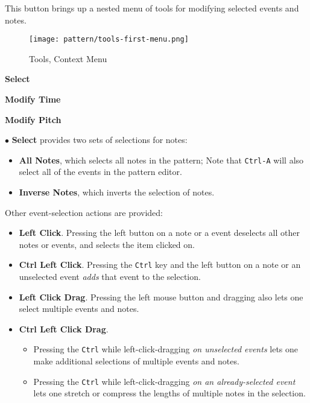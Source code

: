    This button brings up a nested menu of tools for modifying selected
   events and notes.

\begin{figure}[H]
   \centering 
   \texttt{[image: pattern/tools-first-menu.png]}
   \caption{Tools, Context Menu}
   \label{fig:pattern_editor_tools_first_menu}
\end{figure}

   \begin{enumber}
      \item \textbf{Select}
      \item \textbf{Modify Time}
      \item \textbf{Modify Pitch}
   \end{enumber}

   $\bullet$ \textbf{Select} provides two sets of selections for notes:
   \begin{itemize}
      \item \textbf{All Notes}, which selects all notes in the pattern;
         Note that  \texttt{Ctrl-A} will also select
         all of the events in the pattern editor.
      \item \textbf{Inverse Notes}, which inverts the selection of notes.
   \end{itemize}

   Other event-selection actions are provided:

   \begin{itemize}
      \item {}
         \textbf{Left Click}.
         Pressing the left button on a note or a event deselects all other
         notes or events, and selects the item clicked on.
      \item {}
         \textbf{Ctrl Left Click}.
         Pressing the \texttt{Ctrl} key and the left button on a note or an
         unselected event \textsl{adds} that event to the selection.
      \item {}
         \textbf{Left Click Drag}.
         Pressing the left mouse button and dragging also lets one
         select multiple events and notes.
      \item {}
         \textbf{Ctrl Left Click Drag}.
         \begin{itemize}
            \item Pressing the \texttt{Ctrl} while left-click-dragging
               \textsl{on unselected events} lets one make additional
               selections of multiple events and notes.
            \item Pressing the \texttt{Ctrl} while left-click-dragging
               \textsl{on an already-selected event} lets one stretch or
               compress the lengths of multiple notes in the selection.
         \end{itemize}
   \end{itemize}

